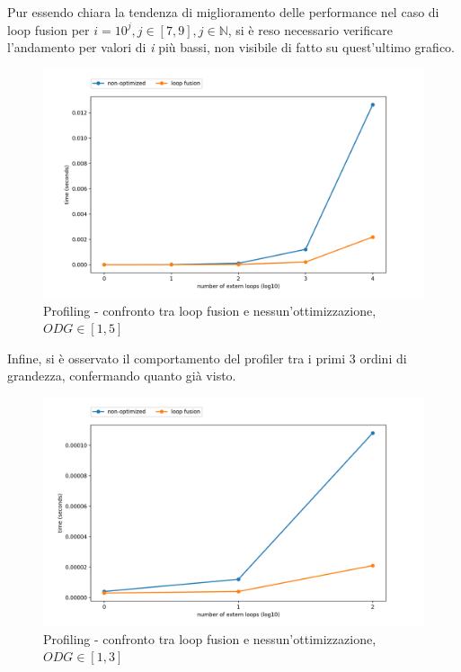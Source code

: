 \documentclass[letterpaper, 11pt]{article}
\begin{document}
\begin{multicols}{2}
  Pur essendo chiara la tendenza di miglioramento delle performance nel caso di loop fusion per $i = 10^j, j \in [7, 9], j \in \mathbb{N}$, si è reso necessario verificare l'andamento per valori di \textit{i} più bassi, non visibile di fatto su quest'ultimo grafico.

  \begin{figure}[H]
    \centering
    \includegraphics[width = 1.1 \linewidth]{../LocalOpts/graph_1-5.png}
    \caption{Profiling - confronto tra loop fusion e nessun'ottimizzazione, $ODG \in [1,5]$}
  \end{figure}

  Infine, si è osservato il comportamento del profiler tra i primi 3 ordini di grandezza, confermando quanto già visto.

  \begin{figure}[H]
    \centering
    \includegraphics[width = 1.1 \linewidth]{../LocalOpts/graph_1-3.png}
    \caption{Profiling - confronto tra loop fusion e nessun'ottimizzazione, $ODG \in [1,3]$}
  \end{figure}


\end{multicols}
\end{document}

